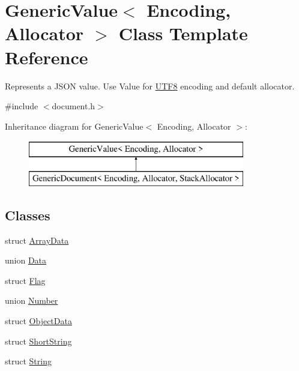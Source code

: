 \hypertarget{a01992}{}\section{Generic\+Value$<$ Encoding, Allocator $>$ Class Template Reference}
\label{a01992}


Represents a J\+S\+ON value. Use Value for \hyperlink{a02144}{U\+T\+F8} encoding and default allocator.  




{\ttfamily \#include $<$document.\+h$>$}

Inheritance diagram for Generic\+Value$<$ Encoding, Allocator $>$\+:\begin{figure}[H]
\begin{center}
\leavevmode
\includegraphics[height=2.000000cm]{a01992}
\end{center}
\end{figure}
\subsection*{Classes}
\begin{DoxyCompactItemize}
\item 
struct \hyperlink{a02112}{Array\+Data}
\item 
union \hyperlink{a02116}{Data}
\item 
struct \hyperlink{a02084}{Flag}
\item 
union \hyperlink{a02096}{Number}
\item 
struct \hyperlink{a02108}{Object\+Data}
\item 
struct \hyperlink{a02092}{Short\+String}
\item 
struct \hyperlink{a02088}{String}
\end{DoxyCompactItemize}
